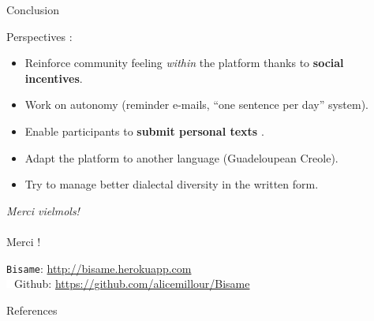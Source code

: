 \documentclass[french]{beamer}
\newcommand{\themename}{\textbf{\textsc{metropolis}}\xspace}
\newcommand{\tool}[1]{\texttt{#1}\xspace}
\begin{document}
\begin{frame}{Conclusion}
  \begin{exampleblock}{\center Perspectives : \\}
    \begin{itemize}
    \item Reinforce community feeling \textit{within} the platform thanks to \textbf{social incentives}. %
    \item Work on autonomy (reminder e-mails, ``one sentence per day'' system).
    \item Enable participants to \textbf{submit personal texts} \cite{Liberm2016}. 
    \item<2-> Adapt the platform to another language (Guadeloupean Creole).
    \item<2-> Try to manage better dialectal diversity in the written form. %
    \end{itemize}
  \end{exampleblock}
\end{frame}

\begin{frame}[standout]
  \textit{Merci vielmols!} \\~\\
  \scriptsize   	
  Merci !
  \begin{center}
    \normalsize
    \tool{Bisame}: \url{http://bisame.herokuapp.com} \\ 
    
    \includegraphics[width=0.02\textwidth]{figures/github-white.png}\enspace Github:         \url{https://github.com/alicemillour/Bisame}
  \end{center}
\end{frame}


%
%

\begin{frame}[allowframebreaks]{References}

  
  
\end{frame}
\end{document}
